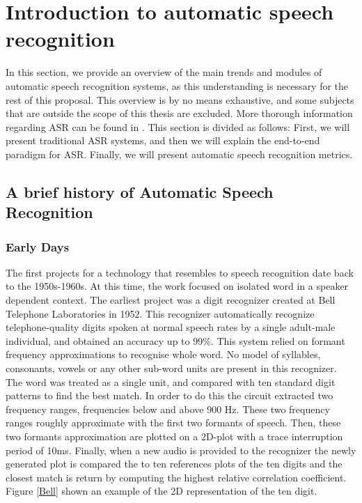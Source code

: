 \newpage
\section{Introduction to automatic speech recognition}%
In this section, we provide an overview of the main trends and modules of automatic speech recognition systems, as this understanding is necessary for the rest of this proposal. This overview is by no means exhaustive, and some subjects that are outside the scope of this thesis are excluded. More thorough information regarding ASR can be found in \cite{benzeghiba2007automatic,karpagavalli2016review,arora2012automatic}. This section is divided as follows: First, we will present traditional ASR systems, and then we will explain the end-to-end paradigm for ASR. Finally, we will present automatic speech recognition metrics.
\subsection{A brief history of Automatic Speech Recognition}

\subsubsection{Early Days}
The first projects for a technology that resembles to speech recognition date back to the 1950s-1960s. At this time, the work focused on isolated word in a speaker dependent context. The earliest project was a digit recognizer created at Bell Telephone Laboratories in 1952. This recognizer automatically recognize telephone-quality digits spoken at normal speech rates by a single adult-male individual, and obtained an accuracy up to 99\%. This system relied on formant frequency approximations to recognise whole word. No model of syllables, consonants, vowels or any other sub-word units are present in this recognizer. The word was treated as a single unit, and compared with ten standard digit patterns to find the best match. In order to do this the circuit extracted two frequency ranges, frequencies below and above 900 Hz. These two frequency ranges roughly approximate with the first two formants of speech. Then, these two formants approximation are plotted on a 2D-plot with a trace interruption period of 10ms. Finally, when a new audio is provided to the recognizer the newly generated plot is compared the to ten references plots of the ten digits and the closest match is return by computing the highest relative correlation coefficient. Figure \ref{Bell}  shown an example of the 2D representation of the ten digit.

